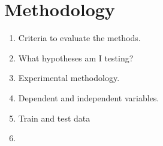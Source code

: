 \section{Methodology}

\begin{enumerate}
    \item Criteria to evaluate the methods.
    \item What hypotheses am I testing?
    \item Experimental methodology.
    \item Dependent and independent variables. 
    \item Train and test data 
    \item {}
\end{enumerate}
